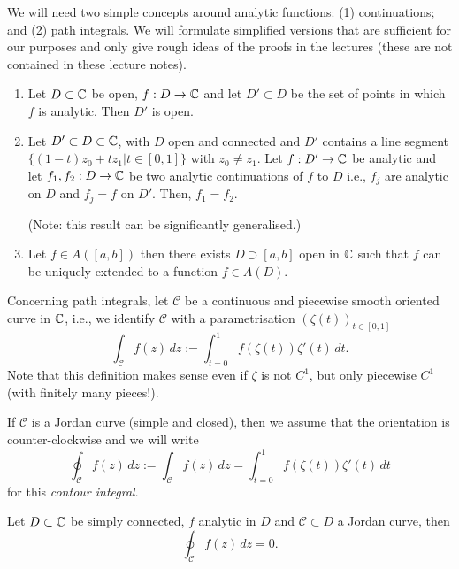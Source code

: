 We will need two simple concepts around analytic functions: (1) continuations;
and (2) path integrals. We will formulate simplified versions that are
sufficient for our purposes and only give rough ideas of the proofs
in the lectures (these are not contained in these lecture notes).

\begin{proposition}
  \begin{enumerate} \ilist
    \item Let $D \subset \mathbb{C}$ be open, $f : D \to \mathbb{C}$ and let $D' \subset D$ be the
    set of points in which $f$ is analytic. Then $D'$ is open.
    \item Let $D' \subset D \subset \mathbb{C}$, with $D$ open and connected and $D'$
    contains a line segment $\{(1-t) z_0 + t z_1 | t \in [0,1] \}$ with $z_0
    \neq z_1$. Let $f : D' \to \mathbb{C}$ be analytic and let $f_1, f_2 : D \to \mathbb{C}$ be
    two analytic continuations of $f$ to $D$ i.e., $f_j$ are analytic on $D$ and
    $f_j = f$ on $D'$. Then, $f_1 = f_2$.

    (Note: this result can be significantly generalised.)
    \item Let $f \in A([a, b])$ then there exists $D \supset [a,b]$ open in $\mathbb{C}$
    such that $f$ can be uniquely extended to a function $f \in A(D)$.
  \end{enumerate}
\end{proposition}

\def\calC{\mathcal{C}}

Concerning path integrals, let $\calC$ be a continuous and piecewise smooth
oriented  curve in $\mathbb{C}$, i.e., we identify $\calC$ with a parametrisation $(\zeta(t))_{t \in [0, 1]}$
\[
    \int_{\calC} f(z) \, dz := \int_{t = 0}^1 f(\zeta(t)) \zeta'(t) \, dt.
\]
Note that this definition makes sense even if $\zeta$ is not $C^1$, but
only piecewise $C^1$ (with finitely many pieces!).

If $\calC$ is a Jordan curve (simple and closed), then we assume that the orientation is counter-clockwise and we will write
\[
    \oint_{\calC} f(z) \,dz := \int_{\calC} f(z) \, dz
    = \int_{t = 0}^1 f(\zeta(t)) \zeta'(t) \, dt
\]
for this {\em contour integral}.

\begin{proposition}
  Let $D \subset \mathbb{C}$ be simply connected, $f$ analytic in $D$ and
    $\calC \subset D$ a Jordan curve, then
    \[
        \oint_{\calC} f(z) \, dz = 0.
    \]
\end{proposition}



